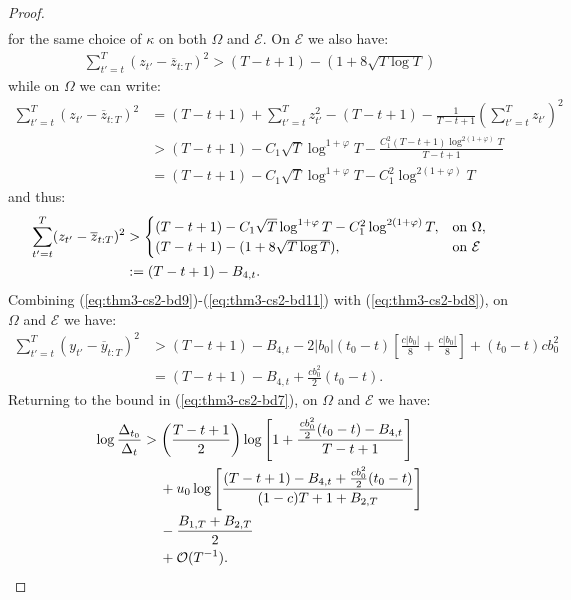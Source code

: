 \begin{proof}
\begin{align}
\end{align}
for the same choice of $\kappa$ on both $\Omega$ and $\mathcal{E}$. On $\mathcal{E}$ we also have:
\begin{align*}
    \sum_{t'=t}^T (z_{t'} - \overline{z}_{t:T})^2 > (T-t +1) - (1 + 8\sqrt{T \log T})
\end{align*}
while on $\Omega$ we  can write:
\begin{align*}
    \sum_{t'=t}^T (z_{t'} - \overline{z}_{t:T})^2 &= (T-t+1) + \sum_{t'=t}^T z^2_{t'} - (T-t+1) - \frac{1}{T-t+1} \left(\sum_{t'=t}^T z_{t'}\right)^2 \\
    &> (T-t+1) - C_1\sqrt{T}\log^{1+\varphi} T - \frac{ C^2_1 (T-t+1)\log^{2(1+\varphi)} T}{T-t+1} \\ 
    &= (T-t+1) - C_1\sqrt{T}\log^{1+\varphi} T - C^2_1 \log^{2(1+\varphi)} T
\end{align*}
and thus:
\begin{align}
    \sum_{t'=t}^T (z_{t'} - \overline{z}_{t:T})^2 &> 
    \begin{cases}
        (T-t+1) - C_1\sqrt{T}\log^{1+\varphi} T - C^2_1 \log^{2(1+\varphi)} T, & \text{on } \Omega,  \\
        (T-t +1) - (1 + 8\sqrt{T \log T}), & \text{on } \mathcal{E}
    \end{cases} \notag \\
    &:= (T-t +1) - B_{4,t}. \label{eq:thm3-cs2-bd11}
\end{align}
Combining (\ref{eq:thm3-cs2-bd9})-(\ref{eq:thm3-cs2-bd11}) with (\ref{eq:thm3-cs2-bd8}), on $\Omega$ and $\mathcal{E}$ we have: 
\begin{align*}
    \sum_{t'=t}^T (y_{t'} - \overline{y}_{t:T})^2 &> (T-t +1) - B_{4,t} - 2|b_0|(t_0-t)\left[\frac{c|b_0|}{8} + \frac{c|b_0|}{8}\right] + (t_0-t)cb_0^2 \\
    &= (T-t +1) - B_{4,t} + \frac{cb_0^2}{2}(t_0 - t).
\end{align*}
Returning to the bound in (\ref{eq:thm3-cs2-bd7}), on $\Omega$ and $\mathcal{E}$ we have: 
\begin{align*}
    \log \frac{\Delta_{t_0}}{\Delta_t} &> \left(\frac{T - t +1}{2}\right)\log\left[1  + \frac{\frac{cb_0^2}{2}(t_0 - t)- B_{4,t}}{T-t+1} \right] \\
    &\quad\: + u_0 \log\left[\frac{(T-t +1) - B_{4,t} + \frac{cb_0^2}{2}(t_0 - t)}{(1-c)T + 1 + B_{2,T}}\right] \\
    &\quad\: - \frac{B_{1,T} + B_{2,T}}{2} \notag \\
    &\quad\: +  \mathcal{O}(T^{-1}). 

\end{align*}
\end{proof}
